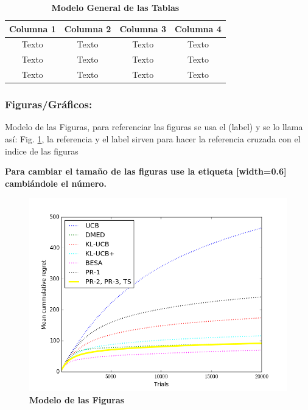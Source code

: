 \begin{table}[!htbp]
\centering
\small
\caption{{\fontsize{11pt}{13}\selectfont \textbf{Modelo General de las Tablas \cite{upm56279}}}}
\label{tbl:modelo}
\begin{tabular}{@{}cccc@{}}
\toprule
\textbf{Columna 1} & \textbf{Columna 2} & \textbf{Columna 3} & \textbf{Columna 4} \\ \midrule
Texto              & Texto              & Texto              & Texto              \\
Texto              & Texto              & Texto              & Texto              \\
Texto              & Texto              & Texto              & Texto              \\ \bottomrule
\end{tabular}
\end{table}

\subsubsection{Figuras/Gráficos:}
Modelo de las Figuras, para referenciar las figuras se usa el (label) y se lo llama así: Fig. \ref{fig:figura1a}, la referencia y el label sirven para hacer la referencia cruzada con el indice de las figuras

\textbf{Para cambiar el tamaño de las figuras use la etiqueta [width=0.6] cambiándole el n\'umero.}

\begin{figure}[!htbp]
    \centering
    \includegraphics[width=1.0\linewidth]{recursos/Figure1a.png}
    \caption{\textbf{Modelo de las Figuras}}
    \label{fig:figura1a}
\end{figure}

